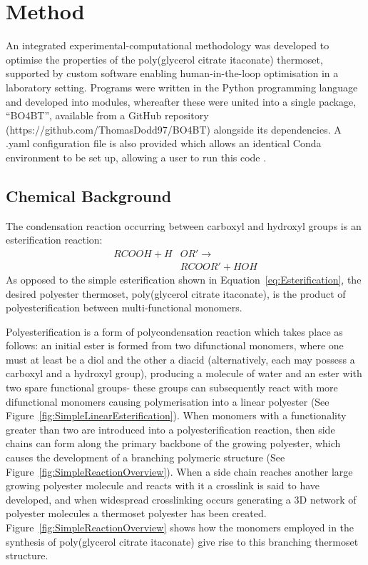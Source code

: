 \section{Method}
An integrated experimental-computational methodology was developed to optimise
 the properties of the poly(glycerol citrate itaconate) thermoset, supported
 by custom software enabling human-in-the-loop optimisation in a laboratory
 setting.
Programs were written in the Python programming language and developed into
 modules, whereafter these were united into a single package, ``BO4BT'', 
 available from a GitHub repository (https://github.com/ThomasDodd97/BO4BT)
 alongside its dependencies.
A .yaml configuration file is also provided which allows an identical
 Conda environment to be set up, allowing a user to run this code
 \autocite{HojlundDodd2024}.

\subsection{Chemical Background}
The condensation reaction occurring between carboxyl and hydroxyl groups 
 is an esterification reaction:
\begin{equation}
    \begin{split}
        RCOOH+H&OR'\rightarrow\\
        &RCOOR'+HOH
    \end{split}
    \label{eq:Esterification}
\end{equation}
As opposed to the simple esterification shown in
 Equation~\ref{eq:Esterification}, the desired polyester thermoset,
 poly(glycerol citrate itaconate), is the product of polyesterification
 between multi-functional monomers.

Polyesterification is a form of polycondensation reaction which takes place 
 as follows: an initial ester is formed from two difunctional monomers,
 where one must at least be a diol and the other a diacid (alternatively,
 each may possess a carboxyl and a hydroxyl group), producing a molecule
 of water and an ester with two spare functional groups- these groups can
 subsequently react with more difunctional monomers causing polymerisation
 into a linear polyester (See Figure~\ref{fig:SimpleLinearEsterification}).
When monomers with a functionality greater than two are introduced into a 
 polyesterification reaction, then side chains can form along the primary
 backbone of the growing polyester, which causes the development of a
 branching polymeric structure (See Figure~\ref{fig:SimpleReactionOverview}).
When a side chain reaches another large growing polyester molecule and
 reacts with it a crosslink is said to have developed, and when widespread
 crosslinking occurs generating a 3D network of polyester molecules a
 thermoset polyester has been created.
Figure~\ref{fig:SimpleReactionOverview} shows how the monomers employed in
 the synthesis of poly(glycerol citrate itaconate) give rise to this
 branching thermoset structure.

